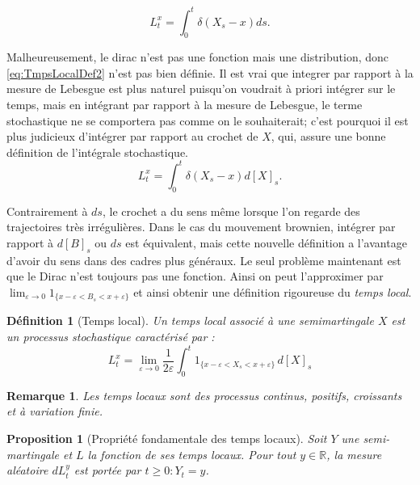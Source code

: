 \documentclass[openany]{book}
\newcommand{\R}{\mathbb{R}}
\theoremstyle{thmfont}
\theoremstyle{deffont}
\newtheorem{definition}[definition]{Définition}
\theoremstyle{thmfont}
\newtheorem{prop}[prop]{Proposition}
\theoremstyle{deffont}
\newtheorem*{remark}{Remarque}
\begin{document}
\begin{equation}
  \label{eq:TmpsLocalDef2}
  L^x_t= \int_0^t\delta(X_s-x)ds.
\end{equation}

Malheureusement, le dirac n'est pas une fonction mais une distribution, donc \eqref{eq:TmpsLocalDef2} n'est pas bien définie. Il est vrai que integrer par rapport à la mesure de Lebesgue est plus naturel puisqu'on voudrait à priori intégrer sur le temps, mais en intégrant par rapport à la mesure de Lebesgue, le terme stochastique ne se comportera pas comme on le souhaiterait; c'est pourquoi il est plus judicieux d'intégrer par rapport au crochet de $X$, qui, assure une bonne définition de l'intégrale stochastique. 
\begin{equation}
  \label{eq:TmpsLocalDef3}
  L^x_t= \int_0^t\delta(X_s-x)d[X]_s.
\end{equation}

Contrairement à $ds$, le crochet a du sens même lorsque l’on regarde des trajectoires très irrégulières. Dans le cas du mouvement brownien, intégrer par rapport à $d[B]_s$ ou $ds$ est équivalent, mais cette nouvelle définition a l'avantage d'avoir du sens dans des cadres plus généraux.
Le seul problème maintenant est que le Dirac n'est toujours pas une fonction. Ainsi on peut l'approximer par $\lim_{\varepsilon\to 0}  1_{\{x - \varepsilon < B_s < x + \varepsilon\}}$ et ainsi obtenir une définition rigoureuse du \textit{temps local}.

\begin{definition}[Temps local] Un \textit{temps local} associé à une semimartingale $X$ est un processus stochastique caractérisé par :
\begin{equation*}
    L_t^x = \lim_{\varepsilon \to 0} \frac{1}{2\varepsilon} \int_0^t 1_{\{x - \varepsilon < X_s < x + \varepsilon\}} \, d[X]_s
\end{equation*}
\end{definition}

\begin{remark}
  Les temps locaux sont des processus \textit{continus}, \textit{positifs}, \textit{croissants} et à \textit{variation finie}.
\end{remark}


\begin{prop}[Propriété fondamentale des temps locaux]
Soit $Y$ une semi-martingale et $L$ la fonction de ses temps locaux. Pour tout $y \in \R$, la mesure aléatoire $dL^y_t$ est portée par ${t \geq 0 : Y_t = y}$.  
\end{prop}
\end{document}
